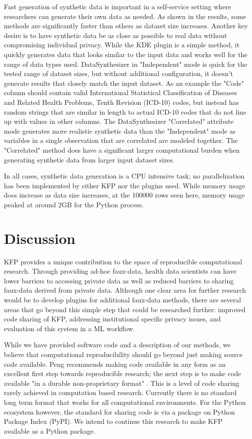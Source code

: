 \documentclass{amia}
\begin{document}
Fast generation of synthetic data is important in a self-service setting where researchers can generate their own data as needed. As shown in the results, some methods are significantly faster than others as dataset size increases. Another key desire is to have synthetic data be as close as possible to real data without compromising individual privacy. While the KDE plugin is a simple method, it quickly generates data that looks similar to the input data and works well for the range of data types used. DataSynthesizer in "Independent" mode is quick for the tested range of dataset sizes, but without additional configuration, it doesn't generate results that closely match the input dataset. As an example the "Code" column should contain valid International Statistical Classification of Diseases and Related Health Problems, Tenth Revision (ICD-10) codes, but instead has random strings that are similar in length to actual ICD-10 codes that do not line up with values in other columns. The DataSynthesizer "Correlated" attribute mode generates more realistic synthetic data than the "Independent" mode as variables in a single observation that are correlated are modeled together. The "Correlated" method does have a significant larger computational burden when generating synthetic data from larger input dataset sizes.

In all cases, synthetic data generation is a CPU intensive task; no parallelization has been implemented by either KFP nor the plugins used. While memory usage does increase as data size increases, at the 100000 rows seen here, memory usage peaked at around 2GB for the Python process.

\section{Discussion}

KFP provides a unique contribution to the space of reproducible computational research. Through providing ad-hoc faux-data, health data scientists can have lower barriers to accessing private data as well as reduced barriers to sharing faux-data derived from private data. Although one clear area for further research would be to develop plugins for additional faux-data methods, there are several areas that go beyond this simple step that could be researched further: improved code sharing of KFP, addressing institutional specific privacy issues, and evaluation of this system in a ML workflow.

While we have provided software code and a description of our methods, we believe that computational reproducibility should go beyond just making source code available. Peng recommends making code available in any form as an excellent first step towards reproducible research; the next step is to make code available "in a durable non-proprietary format" \cite{peng_reproducible_2011}. This is a level of code sharing rarely achieved in computation based research. Currently there is no standard long term format that works for all computational environments. For the Python ecosystem however, the standard for sharing code is via a package on Python Package Index (PyPI). We intend to continue this research to make KFP available as a Python package.
\end{document}
